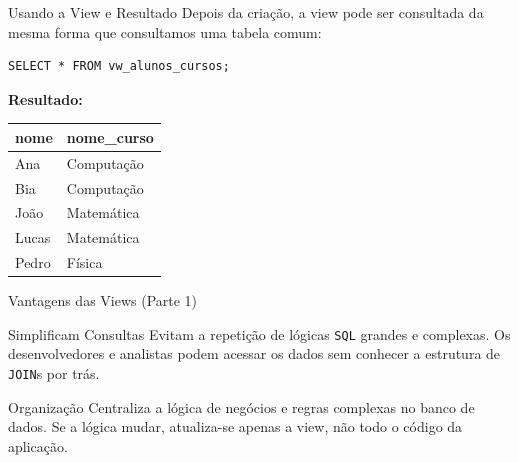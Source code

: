 \documentclass[9pt]{beamer}
\begin{document}
\begin{frame}[fragile]{Usando a View e Resultado}
    Depois da criação, a view pode ser consultada da mesma forma que consultamos uma tabela comum:
    
    \begin{lstlisting}
SELECT * FROM vw_alunos_cursos;
    \end{lstlisting}
    
    \vspace{0.3cm}
    \textbf{Resultado:}
    \begin{center}
        \begin{tabular}{|l|l|}
            \hline
            \textbf{nome} & \textbf{nome\_curso} \\
            \hline
            Ana & Computação \\
            Bia & Computação \\
            João & Matemática \\
            Lucas & Matemática \\
            Pedro & Física \\
            \hline
        \end{tabular}
    \end{center}
\end{frame}

\begin{frame}{Vantagens das Views (Parte 1)}
    \begin{block}{Simplificam Consultas}
        Evitam a repetição de lógicas \texttt{SQL} grandes e complexas. Os desenvolvedores e analistas podem acessar os dados sem conhecer a estrutura de \texttt{JOIN}s por trás.
    \end{block}
    
    \vspace{0.5cm}
    
    \begin{block}{Organização}
        Centraliza a lógica de negócios e regras complexas no banco de dados. Se a lógica mudar, atualiza-se apenas a view, não todo o código da aplicação.
    \end{block}
\end{frame}
\end{document}
